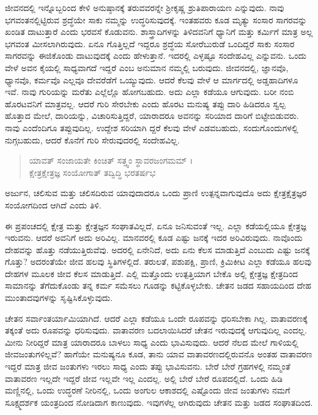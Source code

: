 ಜೀವನದಲ್ಲಿ ಇನ್ನೊಬ್ಬರಿಂದ ಕೇಳಿ ಅನುಷ್ಠಾನಕ್ಕೆ ತರುವವರನ್ನೇ ಶ್ರೀಕೃಷ್ಣ ಶ್ರುತಿಪಾರಾಯಣ ಎನ್ನುವುದು. ನಾವು ಭಗವಂತನಲ್ಲಿಟ್ಟಿರುವ ಶ್ರದ್ಧೆಯೇ ಸಾಕು ನಮ್ಮನ್ನು ಉದ್ಧರಿಸುವುದಕ್ಕೆ. ಇಂತಹವರು ಕೂಡ ಮೃತ್ಯು ಸಂಸಾರ ಸಾಗರವನ್ನು ಖಂಡಿತ ದಾಟುತ್ತಾರೆ ಎಂದು ಭರವಸೆ ಕೊಡುವನು. ಶಾಸ್ತ್ರಾದಿಗಳನ್ನು ತಿಳಿದವನಿಗೆ ಧ್ಯಾನಿಗೆ ಮತ್ತು ಕರ್ಮಿಗೆ ಮಾತ್ರ ಅಲ್ಲ ಭಗವಂತ ಮೀಸಲಾಗಿರುವುದು. ಏನೂ ಗೊತ್ತಿಲ್ಲದೆ ಇದ್ದರೂ ಶ್ರದ್ಧೆಯ ಸೋರೆಬುರುಡೆ ಒಂದಿದ್ದರೆ ಸಾಕು ಸಂಸಾರ ಸಾಗರವನ್ನು ಈಜಿಕೊಂಡು ದಾಟುವುದಕ್ಕೆ ಎಂದು ಹೇಳುತ್ತಾನೆ. ಇದರಲ್ಲಿ ಎಳ್ಳಷ್ಟೂ ಸಂದೇಹವಿಲ್ಲ ಎನ್ನುವನು. ಒಂದು ವೇಳೆ ಅವನ ಕೈಯಲ್ಲಿ ಸಾಧ್ಯವಾಗದೆ ಇದ್ದರೆ ಎಂಬ ಅನುಮಾನ ನಮ್ಮಲ್ಲಿ ಬರುವುದು. ಜೀವನದಲ್ಲಿ, ಜ್ಞಾನವೊ, ಧ್ಯಾನವೊ, ಕರ್ಮವೊ ಎಲ್ಲವೂ ದೇವರೆಡೆಗೆ ಒಯ್ಯುವುದು. ಆದರೆ ಕೆಲವು ವೇಳೆ ಆ ಮಾರ್ಗದಲ್ಲಿ ಅಡ್ಡಹಾದಿಗಳೂ ಇವೆ. ನಾವು ಗುರಿಯನ್ನು ಮರೆತು ಎಲ್ಲೆಲ್ಲೊ ಹೋಗಬಹುದು. ಅದು ಎಲ್ಲಾ ಕಡೆಯೂ ಆಗುವುದು. ಬರೀ ನಂಬಿ ಹೊರಟವನಿಗೆ ಮಾತ್ರವಲ್ಲ. ಆದರೆ ಗುರಿ ಸೇರಬೇಕು ಎಂದು ಹೊರಟ ಮನುಷ್ಯ ತಪ್ಪು ದಾರಿ ಹಿಡಿದರೂ ಸ್ವಲ್ಪ ಹೊತ್ತಾದ ಮೇಲೆ, ದಾರಿಯನ್ನು, ವಿಚಾರಿಸುತ್ತಿದ್ದರೆ, ಯಾರಾದರೂ ಅವನನ್ನು ಸರಿಯಾದ ದಾರಿಗೆ ಬಿಟ್ಟೇಬಿಡುವರು. ನಾವು ಎಂದೆಂದಿಗೂ ತಪ್ಪುವುದಿಲ್ಲ. ಉದ್ದೇಶ ಸರಿಯಾಗಿ ದ್ದರೆ ಕೆಲವು ವೇಳೆ ಎಡವಬಹುದು, ಸಂದುಗೊಂದುಗಳಲ್ಲಿ ನುಗ್ಗಬಹುದು, ಆದರೆ ಕೊನೆಗೆ ಗುರಿ ಸೇರುವುದರಲ್ಲಿ ಸಂದೇಹವಿಲ್ಲ.

\begin{verse}
ಯಾವತ್ ಸಂಜಾಯತೇ ಕಿಂಚಿತ್ ಸತ್ತ್ವಂ ಸ್ಥಾವರಜಂಗಮಮ್ ।\\ಕ್ಷೇತ್ರಕ್ಷೇತ್ರಜ್ಞ ಸಂಯೋಗಾತ್ ತದ್ವಿದ್ಧಿ ಭರತರ್ಷಭ 
\end{verse}

{\small ಅರ್ಜುನ, ಚಲಿಸುವ ಮತ್ತು ಚಲಿಸದಿರುವ ಯಾವುದಾದರೂ ಒಂದು ಪ್ರಾಣಿ ಉತ್ಪನ್ನವಾಗುವುದೊ ಅದು ಕ್ಷೇತ್ರಕ್ಷೆತ್ರಜ್ಞರ ಸಂಯೋಗದಿಂದ ಆಗಿದೆ ಎಂದು ತಿಳಿ.}

ಈ ಪ್ರಪಂಚದಲ್ಲಿ ಕ್ಷೇತ್ರ ಮತ್ತು ಕ್ಷೇತ್ರಜ್ಞನ ಸಂಘಾತವಿಲ್ಲದೆ, ಏನೂ ಜನಿಸುವಂತೆ ಇಲ್ಲ. ಎಲ್ಲಾ ಕಡೆಯಲ್ಲಿಯೂ ಕ್ಷೇತ್ರಜ್ಞ ಇರುವನು. ಆದರೆ ಅವನಿಗೆ ಅದು ಅರಿವಿಲ್ಲ. ಮಾನವರಲ್ಲಿ ಕೂಡ ಎಷ್ಟು ಜನಕ್ಕೆ ಇದರ ಅರಿವಿರುವುದು. ನಾವೊಂದು ದೇಹವನ್ನು ಹೊತ್ತು ನಡೆಯುತ್ತಿರುವೆವು. ಅದರಲ್ಲಿ ಏನೇನಿದೆ, ಅದು ಏನು ಕೆಲಸ ಮಾಡುತ್ತಿದೆ ಎಂಬುದು ಎಷ್ಟು ಜನಕ್ಕೆ ಗೊತ್ತು? ಅದರಂತೆಯೇ ಜೀವ ಹಲವು ಸ್ಥಿತಿಗಳಲ್ಲಿದೆ. ತರುಲತೆ, ಪಶುಪಕ್ಷಿ, ಪ್ರಾಣಿ, ಕ್ರಿಮಿಕೀಟ ಎಲ್ಲಾ ಕಡೆಯೂ ಹಲವು ದೇಹಗಳ ಮೂಲಕ ಜೀವ ಕೆಲಸ ಮಾಡುತ್ತಿದೆ. ಎಲ್ಲಿ ಮತ್ತೊಂದು ಉತ್ಪತ್ತಿಯಾಗ ಬೇಕೊ ಅಲ್ಲಿ ಕ್ಷೇತ್ರಜ್ಞ ಕ್ಷೇತ್ರದಿಂದ ಸಾಮಾನನ್ನು ತೆಗೆದುಕೊಂಡು ತನ್ನ ಕರ್ಮ ಸಮೆಸಲು ಗೂಡನ್ನು ಕಟ್ಟಿಕೊಳ್ಳಬೇಕು. ಚೇತನ ಜಡದ ಸಹಾಯದಿಂದ ದೇಹ ಮುಂತಾದವುಗಳನ್ನು ಸೃಷ್ಟಿಸಿಕೊಳ್ಳುವುದು.

ಚೇತನ ಸರ್ವಾಂತರ್ಯಾಮಿಯಾಗಿದೆ. ಆದರೆ ಎಲ್ಲಾ ಕಡೆಯೂ ಒಂದೇ ರೂಪವನ್ನು ಧರಿಸಬೇಕಾ ಗಿಲ್ಲ. ವಾತಾವರಣಕ್ಕೆ ತಕ್ಕಂತೆ ಅದು ರೂಪವನ್ನು ಧರಿಸುವುದು. ವಾತಾವರಣ ಬದಲಾಯಿಸಿದರೆ ಚೇತನ ಇರುವುದಕ್ಕೆ ಆಗುವುದಿಲ್ಲ ಎಂದಲ್ಲ. ಮೀನು ನೀರಿದ್ದರೆ ಮಾತ್ರ ಯಾರಾದರೂ ಬಾಳಲು ಸಾಧ್ಯ ಎಂದು ಭಾವಿಸುವುದು. ಆದರೆ ನೆಲದ ಮೇಲೆ ಗಾಳಿಯಲ್ಲಿ ಜೀವಜಂತುಗಳಿಲ್ಲವೆ? ಹಾಗೆಯೇ ಮನುಷ್ಯನೂ ಕೂಡ, ತಾನು ಯಾವ ವಾತಾವರಣದಲ್ಲಿರುವನೊ ಅಂತಹ ವಾತಾವರಣ ಇದ್ದರೆ ಮಾತ್ರ ಜೀವ ಜಂತುಗಳು ಇರಲು ಸಾಧ್ಯ ಎಂದು ತಪ್ಪು ಭಾವಿಸುವನು. ಬೇರೆ ಬೇರೆ ಗ್ರಹಗಳಲ್ಲಿ ನಮ್ಮಂತೆ ವಾತಾವರಣ ಇಲ್ಲದೇ ಇದ್ದರೆ ಜೀವ ಇಲ್ಲವೇ ಇಲ್ಲ ಎಂದಲ್ಲ. ಅಲ್ಲಿ ಬೇರೆ ಬೇರೆ ರೂಪದಲ್ಲಿದೆ. ಒಂದು ಹಿಡಿ ಮಣ್ಣಿನಲ್ಲಿ, ಒಂದು ಉದ್ಧರಣೆ ನೀರಿನಲ್ಲಿ, ಒಂದು ಅಂಗುಲ ಆಕಾಶದಲ್ಲಿ ಎಷ್ಟೊಂದು ಜೀವ ಜಂತುಗಳು ನಮಗೆ ಸೂಕ್ಷ್ಮದರ್ಶಕ ಯಂತ್ರದಿಂದ ನೋಡಿದಾಗ ಕಾಣುವುದು. ಇವುಗಳೆಲ್ಲ ಆಗಿರುವುದು ಚೇತನ ಮತ್ತು ಜಡದ ಸಂಘಾತದಿಂದ.

